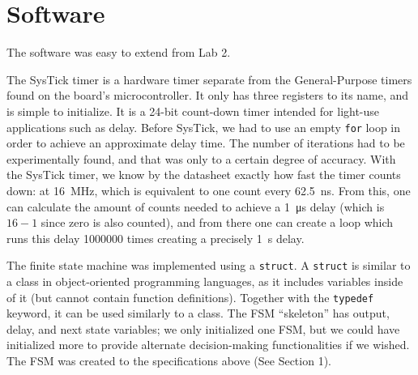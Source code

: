 \documentclass{article}
\renewcommand{\c}[1]{\texttt{#1}}
\begin{document}
\section{Software} The software was easy to extend from Lab 2.

The SysTick timer is a hardware timer separate from the
General-Purpose timers found on the board's microcontroller.
It only has three registers to its name, and is simple to
initialize.
It is a 24-bit count-down timer intended for light-use
applications such as delay. Before SysTick, we had to use
an empty \c{for} loop in order to achieve an approximate
delay time. The number of iterations had to be experimentally
found, and that was only to a certain degree of accuracy. With
the SysTick timer, we know by the datasheet exactly how fast
the timer counts down: at \SI{16}{\mega\hertz}, which is
equivalent to one count every \SI{62.5}{\nano\second}.
From this, one can calculate the amount of counts needed to
achieve a \SI{1}{\micro\second} delay (which is \(16-1\) since
zero is also counted), and from there one can create a loop
which runs this delay \num{1000000} times creating a precisely
\SI{1}{\second} delay.

The finite state machine was implemented using a \c{struct}.
A \c{struct} is similar to a class in object-oriented
programming languages, as it includes variables inside of it
(but cannot contain function definitions). Together with the
\c{typedef} keyword, it can be used similarly to a class.
The FSM ``skeleton'' has output, delay, and next state variables;
we only initialized one FSM, but we could have initialized more
to provide alternate decision-making functionalities if we wished.
The FSM was created to the specifications above (See Section 1).

\pagebreak
\end{document}
